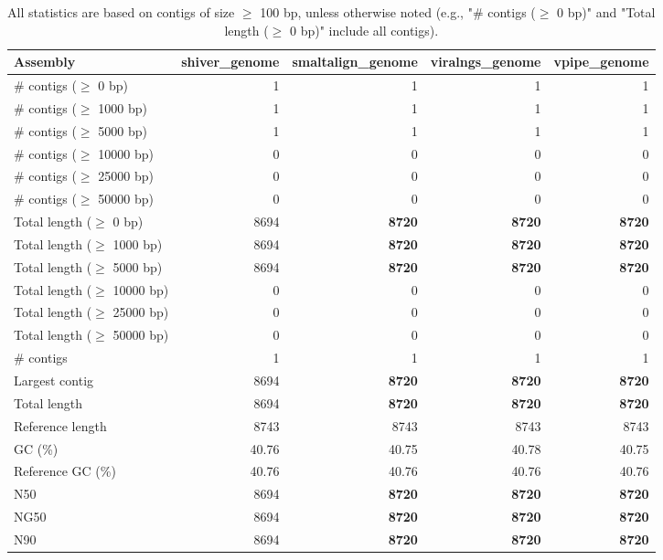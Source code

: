 \documentclass[12pt,a4paper]{article}
\begin{document}
\begin{table}[ht]
\begin{center}
\caption{All statistics are based on contigs of size $\geq$ 100 bp, unless otherwise noted (e.g., "\# contigs ($\geq$ 0 bp)" and "Total length ($\geq$ 0 bp)" include all contigs).}
\begin{tabular}{|l*{4}{|r}|}
\hline
Assembly & shiver\_genome & smaltalign\_genome & viralngs\_genome & vpipe\_genome \\ \hline
\# contigs ($\geq$ 0 bp) & 1 & 1 & 1 & 1 \\ \hline
\# contigs ($\geq$ 1000 bp) & 1 & 1 & 1 & 1 \\ \hline
\# contigs ($\geq$ 5000 bp) & 1 & 1 & 1 & 1 \\ \hline
\# contigs ($\geq$ 10000 bp) & 0 & 0 & 0 & 0 \\ \hline
\# contigs ($\geq$ 25000 bp) & 0 & 0 & 0 & 0 \\ \hline
\# contigs ($\geq$ 50000 bp) & 0 & 0 & 0 & 0 \\ \hline
Total length ($\geq$ 0 bp) & 8694 & {\bf 8720} & {\bf 8720} & {\bf 8720} \\ \hline
Total length ($\geq$ 1000 bp) & 8694 & {\bf 8720} & {\bf 8720} & {\bf 8720} \\ \hline
Total length ($\geq$ 5000 bp) & 8694 & {\bf 8720} & {\bf 8720} & {\bf 8720} \\ \hline
Total length ($\geq$ 10000 bp) & 0 & 0 & 0 & 0 \\ \hline
Total length ($\geq$ 25000 bp) & 0 & 0 & 0 & 0 \\ \hline
Total length ($\geq$ 50000 bp) & 0 & 0 & 0 & 0 \\ \hline
\# contigs & 1 & 1 & 1 & 1 \\ \hline
Largest contig & 8694 & {\bf 8720} & {\bf 8720} & {\bf 8720} \\ \hline
Total length & 8694 & {\bf 8720} & {\bf 8720} & {\bf 8720} \\ \hline
Reference length & 8743 & 8743 & 8743 & 8743 \\ \hline
GC (\%) & 40.76 & 40.75 & 40.78 & 40.75 \\ \hline
Reference GC (\%) & 40.76 & 40.76 & 40.76 & 40.76 \\ \hline
N50 & 8694 & {\bf 8720} & {\bf 8720} & {\bf 8720} \\ \hline
NG50 & 8694 & {\bf 8720} & {\bf 8720} & {\bf 8720} \\ \hline
N90 & 8694 & {\bf 8720} & {\bf 8720} & {\bf 8720} \\ \hline

\end{tabular}
\end{center}
\end{table}
\end{document}
